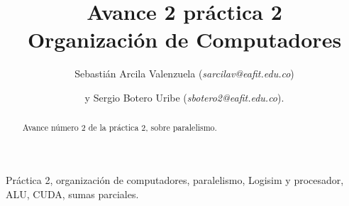 \documentclass[%
		final,
		notitlepage,
		narroweqnarray,
		inline,
		twoside,
		]{ieee}
\begin{document}
	 
	\title[Avance  práctica 2]{%
	       Avance 2 práctica 2 \\  Organización de Computadores}
	 
	\author[]{Sebastián Arcila Valenzuela (\textit{sarcilav@eafit.edu.co})
	\and{}y Sergio Botero Uribe (\textit{sbotero2@eafit.edu.co}).
	}
	 
	 
	\titletext{, \today} 
	 
	 
	\maketitle               
	 
	\begin{abstract} 
	Avance número 2 de la práctica 2, sobre paralelismo.
	\end{abstract}
	 
	\begin{keywords}
	Práctica 2, organización de computadores, paralelismo, Logisim y procesador, ALU, CUDA, sumas parciales.
	\end{keywords}
	 
\end{document}
